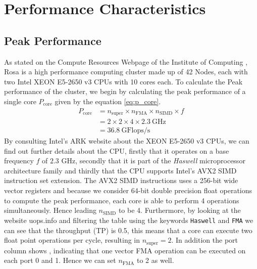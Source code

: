 \section{Performance Characteristics }
\subsection{Peak Performance}
As stated on the Compute Resources Webpage of the Institute of Computing \cite{noauthor_compute_nodate}, Rosa is a high performance computing cluster made up of 42 Nodes, each with two Intel XEON E5-2650 v3 CPUs with 10 cores each.
To calculate the Peak performance of the cluster, we begin by calculating the peak performance of a single core $P_{\text{core}}$ given by the equation \ref{eq:p_core}.
\begin{equation} \label{eq:p_core}
	\begin{aligned}
		P_{\text {core}} & =n_{\text {super}} \times n_{\text {FMA}} \times n_{\text {SIMD}} \times f \\
		                 & = 2 \times 2 \times 4 \times 2.3 \ \text{GHz}                              \\
		                 & = 36.8 \ \text{GFlops/s}
	\end{aligned}
\end{equation}
By consulting Intel's ARK website \cite{noauthor_intel_nodate} about the XEON E5-2650 v3 CPUs, we can find out further details about the CPU, firstly that it operates on a base frequency $f$ of $2.3$ GHz, secondly that it is part of the \textit{Haswell} microprocessor architecture family and thirdly that the CPU supports Intel's AVX2 SIMD instruction set extension.
The AVX2 SIMD instructions \cite{noauthor_intel_nodate-1} uses a 256-bit wide vector registers and because we consider 64-bit double precision float operations to compute the peak performance, each core is able to perform 4 operations simultaneously. Hence leading $n_{\text{SIMD}}$ to be 4.
Furthermore, by looking at the website uops.info \cite{noauthor_uopsinfo_nodate} and filtering the table using the keywords \texttt{Haswell} and \texttt{FMA} we can see that the throughput (TP) is 0.5, this means that a core can execute two float point operations per cycle, resulting in $n_{\text{super}} = 2$. In addition the port column shows , indicating that one vector FMA operation can be executed on each port 0 and 1. Hence we can set $n_{\text{FMA}}$ to 2 as well.\newline
